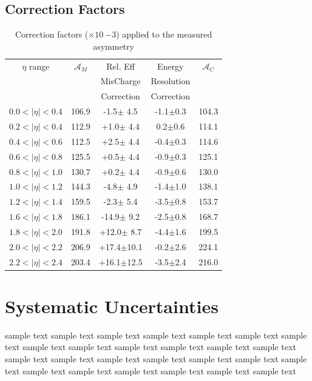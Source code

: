 \subsection{Correction Factors}

\begin{table}[htb]
  \begin{center}
    \begin{tabular}{ccccc}
$\eta$ range & $\mathcal{A}_M$ & Rel. Eff & Energy & $\mathcal{A}_C$ \\
& & MisCharge & Resolution &  \\
& & Correction  & Correction & \\
\hline
 $0.0<|\eta|<0.4$ & 106.9 &-1.5$\pm$ 4.5 & -1.1$\pm$0.3 & 104.3\\ 
 $0.2<|\eta|<0.4$ & 112.9 &+1.0$\pm$ 4.4 &  0.2$\pm$0.6 & 114.1\\ 
 $0.4<|\eta|<0.6$ & 112.5 &+2.5$\pm$ 4.4 & -0.4$\pm$0.3 & 114.6\\
 $0.6<|\eta|<0.8$ & 125.5 &+0.5$\pm$ 4.4 & -0.9$\pm$0.3 & 125.1\\ 
 $0.8<|\eta|<1.0$ & 130.7 &+0.2$\pm$ 4.4 & -0.9$\pm$0.6 & 130.0\\ 
 $1.0<|\eta|<1.2$ & 144.3 &-4.8$\pm$ 4.9 & -1.4$\pm$1.0 & 138.1\\ 
 $1.2<|\eta|<1.4$ & 159.5 &-2.3$\pm$ 5.4 & -3.5$\pm$0.8 & 153.7\\ 
 $1.6<|\eta|<1.8$ & 186.1 &-14.9$\pm$ 9.2 & -2.5$\pm$0.8 & 168.7\\
 $1.8<|\eta|<2.0$ & 191.8 &+12.0$\pm$ 8.7 & -4.4$\pm$1.6 & 199.5\\
 $2.0<|\eta|<2.2$ & 206.9 &+17.4$\pm$10.1&  -0.2$\pm$2.6 & 224.1\\
 $2.2<|\eta|<2.4$ & 203.4 &+16.1$\pm$12.5 & -3.5$\pm$2.4 & 216.0\\

    \end{tabular}
    \caption{\label{tab:CorrectionFactors}Correction factors ($\times 10~{-3}$) applied to the measured asymmetry}
  \end{center}
\end{table}


\section{Systematic Uncertainties}
sample text sample text sample text sample text sample text sample text sample
text sample text sample text sample text sample text sample text sample text
sample text sample text sample text sample text sample text sample text sample
text sample text sample text sample text sample text sample text sample text

